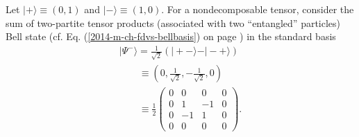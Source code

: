 {
\color{blue}
\bexample
Let
$\vert + \rangle  \equiv   (0,1)$
and
$\vert - \rangle  \equiv   (1,0)$.
For a nondecomposable tensor, consider the sum of two-partite tensor products (associated with two ``entangled'' particles)
Bell state (cf. Eq. (\ref{2014-m-ch-fdvs-bellbasis}) on page \pageref{2014-m-ch-fdvs-bellbasis}) in the standard basis     
\begin{equation}
\begin{split}
\vert \Psi^-\rangle = \frac{1}{\sqrt{2}}\left(\vert +-\rangle   - \vert -+\rangle  \right)   \\
\qquad \equiv  \left( 0,\frac{1}{\sqrt{2}},- \frac{1}{\sqrt{2}} ,  0 \right)     \\
\qquad \equiv  \frac{1}{2}
\begin{pmatrix}
0&0&0&0\\
0&1&-1&0\\
0&-1&1&0\\
0&0&0&0
\end{pmatrix}
.
\end{split}
\label{2011-m-bellstatenondec}
\end{equation}

}
